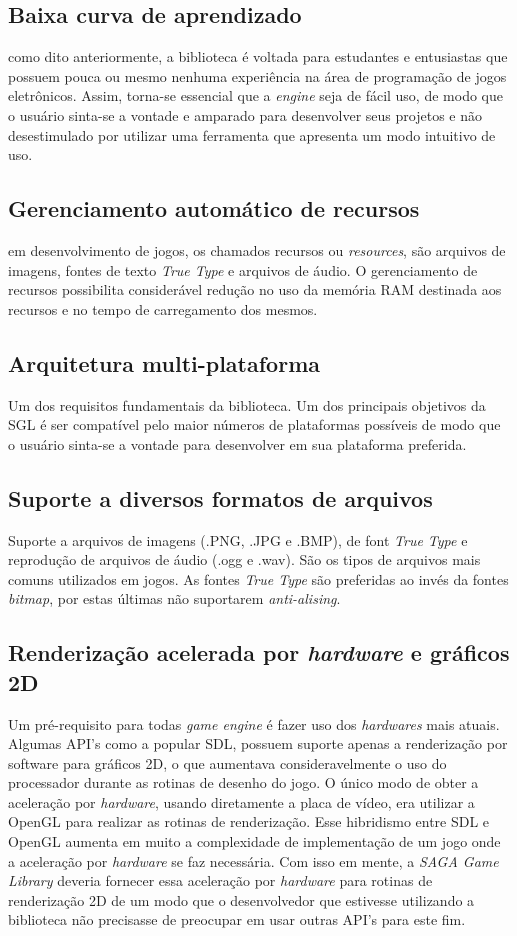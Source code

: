 \subsection{Baixa curva de aprendizado}
%
como dito anteriormente, a biblioteca é voltada para estudantes e entusiastas que possuem pouca ou mesmo nenhuma experiência na área de programação de jogos eletrônicos. Assim, torna-se essencial que a \textit{engine} seja de fácil uso, de modo que o usuário sinta-se a vontade e amparado para desenvolver seus projetos e não desestimulado por utilizar uma ferramenta que apresenta um modo intuitivo de uso.
%
\subsection{Gerenciamento automático de recursos}
%
em desenvolvimento de jogos, os chamados recursos ou \textit{resources}, são arquivos de imagens, fontes de texto \textit{True Type} e arquivos de áudio. O gerenciamento de recursos possibilita considerável redução no uso da memória RAM destinada aos recursos e no tempo de carregamento dos mesmos.
%
\subsection{Arquitetura multi-plataforma}
%
Um dos requisitos fundamentais da biblioteca. Um dos principais objetivos da SGL é ser compatível pelo maior números de plataformas possíveis de modo que o usuário sinta-se a vontade para desenvolver em sua plataforma preferida.
%
\subsection{Suporte a diversos formatos de arquivos}
%
Suporte a arquivos de imagens (.PNG, .JPG e .BMP), de font \textit{True Type} e reprodução de arquivos de áudio (.ogg e .wav). São os tipos de arquivos mais comuns utilizados em jogos. As fontes \textit{True Type} são preferidas ao invés da fontes \textit{bitmap}, por estas últimas não suportarem \textit{anti-alising}. 
%
\subsection{Renderização acelerada por \textit{hardware} e gráficos 2D}
%
Um pré-requisito para todas \textit{game engine} é fazer uso dos \textit{hardwares} mais atuais. Algumas API's como a popular SDL, possuem suporte apenas a renderização por software para gráficos 2D, o que aumentava consideravelmente o uso do processador durante as rotinas de desenho do jogo. O único modo de obter a aceleração por \textit{hardware}, usando diretamente a placa de vídeo, era utilizar a OpenGL para realizar as rotinas de renderização. Esse hibridismo entre SDL e OpenGL aumenta em muito a complexidade de implementação de um jogo onde a aceleração por \textit{hardware} se faz necessária. Com isso em mente, a \textit{SAGA Game Library} deveria fornecer essa aceleração por \textit{hardware}
para rotinas de renderização 2D de um modo que o desenvolvedor que estivesse utilizando a biblioteca não precisasse de preocupar em usar outras API's para este fim.
%
